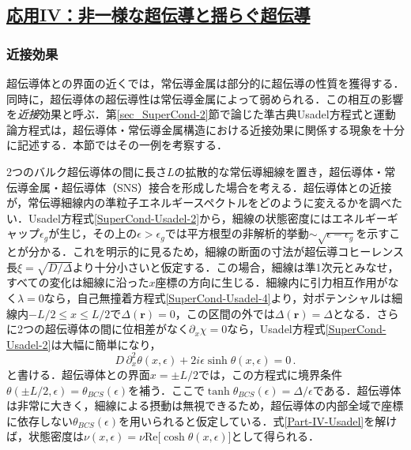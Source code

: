 \documentclass[a4paper,11pt]{ltjsarticle}
\newcommand{\subsectionlink}[1]{\subsection[#1]{\hyperlink{toc}{#1}}}
\begin{document}
\subsectionlink{応用IV：非一様な超伝導と揺らぐ超伝導}\label{app_Part-IV}

\subsubsection{近接効果}\label{app_Part-IV-1}

超伝導体との界面の近くでは，常伝導金属は部分的に超伝導の性質を獲得する．同時に，超伝導体の超伝導性は常伝導金属によって弱められる．この相互の影響を\textit{近接}効果と呼ぶ．第\ref{sec_SuperCond-2}節で論じた準古典Usadel方程式と運動論方程式は，超伝導体・常伝導金属構造における近接効果に関係する現象を十分に記述する．本節ではその一例を考察する．

2つのバルク超伝導体の間に長さ$L$の拡散的な常伝導細線を置き，超伝導体・常伝導金属・超伝導体（SNS）接合を形成した場合を考える．超伝導体との近接が，常伝導細線内の準粒子エネルギースペクトルをどのように変えるかを調べたい．Usadel方程式\eqref{SuperCond-Usadel-2}から，細線の状態密度にはエネルギーギャップ$\epsilon_{g}$が生じ，その上の$\epsilon>\epsilon_{g}$では平方根型の非解析的挙動$\sim \sqrt{\epsilon-\epsilon_{g}}$を示すことが分かる\cite{Zhou,GolubovKupriyanov}．これを明示的に見るため，細線の断面の寸法が超伝導コヒーレンス長$\xi=\sqrt{D/\Delta}$より十分小さいと仮定する．この場合，細線は準1次元とみなせ，すべての変化は細線に沿った$x$座標の方向に生じる．細線内に引力相互作用がなく$\lambda=0$なら，自己無撞着方程式\eqref{SuperCond-Usadel-4}より，対ポテンシャルは細線内$-L/2\leqslant x\leqslant L/2$で$\Delta(\mathbf{r})=0$，この区間の外では$\Delta(\mathbf{r})=\Delta$となる．さらに2つの超伝導体の間に位相差がなく$\partial_{x}\chi=0$なら，Usadel方程式\eqref{SuperCond-Usadel-2}は大幅に簡単になり，
\begin{equation}\label{Part-IV-Usadel}
D\,\partial^{2}_{x}\theta(x,\epsilon)+2i\epsilon\sinh\theta(x,\epsilon)=0\,.
\end{equation}
と書ける．超伝導体との界面$x=\pm L/2$では，この方程式に境界条件$\theta(\pm L/2,\epsilon)=\theta_{BCS}(\epsilon)$を補う．ここで$\tanh\theta_{BCS}(\epsilon)=\Delta/\epsilon$である．超伝導体は非常に大きく，細線による摂動は無視できるため，超伝導体の内部全域で座標に依存しない$\theta_{BCS}(\epsilon)$を用いられると仮定している．式\eqref{Part-IV-Usadel}を解けば，状態密度は$\nu(x,\epsilon)=\nu\mathrm{Re}\big[\cosh\theta(x,\epsilon)\big]$として得られる．
\end{document}
